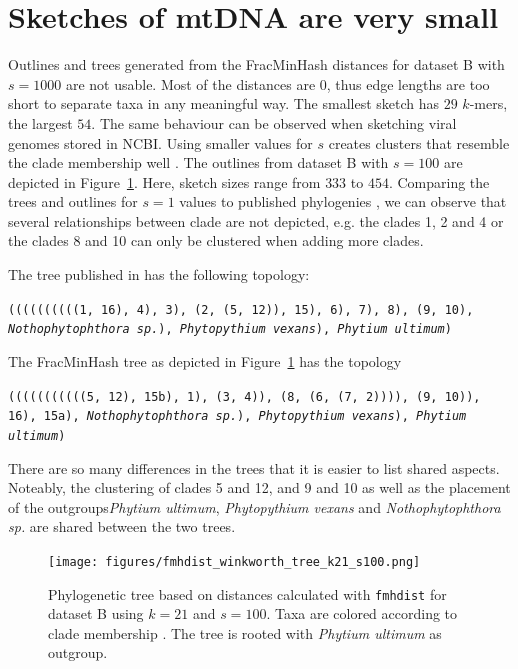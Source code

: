 \section{Sketches of mtDNA are very small}
Outlines and trees generated from the FracMinHash distances for dataset B with
$s=1000$ are not usable. Most of the distances are 0, thus edge lengths are too
short to separate taxa in any meaningful way. The smallest sketch has $29$
$k$-mers, the largest $54$. The same behaviour can be observed when sketching
viral genomes stored in NCBI. Using smaller values for $s$ creates clusters that
resemble the clade membership well
\cite{abadPhytophthoraTaxonomicPhylogenetic2023a,yangExpandedPhylogenyGenus2017}.
The outlines from dataset B with $s=100$ are depicted in
Figure~\ref{fig:winkworthTree}. Here, sketch sizes range from $333$ to $454$.
Comparing the trees and outlines for $s=1$ values to published phylogenies
\cite{abadPhytophthoraTaxonomicPhylogenetic2023a,yangExpandedPhylogenyGenus2017},
we can observe that several relationships between clade are not depicted, e.g.
the clades 1, 2 and 4 or the clades 8 and 10 can only be clustered when adding
more clades.


The tree published in \cite{winkworthComparativeAnalysesComplete2022} has the
following topology:

\texttt{((((((((((1, 16), 4), 3), (2, (5, 12)), 15), 6),
7), 8), (9, 10), \textit{Nothophytophthora sp.}), \textit{Phytopythium vexans}),
\textit{Phytium ultimum})}

The FracMinHash tree as depicted in Figure~\ref{fig:winkworthTree} has the topology

\texttt{(((((((((((5, 12), 15b), 1), (3, 4)), (8, (6, (7, 2)))), (9, 10)), 16),
15a), \textit{Nothophytophthora sp.}), \textit{Phytopythium
vexans}), \textit{Phytium ultimum})}


There are so many differences in the trees that it is easier to list shared
aspects. Noteably, the clustering of clades 5 and 12, and 9 and 10 as well as
the placement of the outgroups\textit{Phytium ultimum}, \textit{Phytopythium
vexans} and \textit{Nothophytophthora sp.} are shared between the two trees.

\begin{figure}
  \centering
  \texttt{[image: figures/fmhdist\_winkworth\_tree\_k21\_s100.png]}
  \caption{Phylogenetic tree based on distances calculated with \texttt{fmhdist}
  for dataset B using $k=21$ and $s=100$. Taxa are colored according to clade
  membership
  \cite{abadPhytophthoraTaxonomicPhylogenetic2023a,winkworthComparativeAnalysesComplete2022}.
  The tree is rooted with \textit{Phytium ultimum} as outgroup.}
  \label{fig:winkworthTree}
\end{figure}

